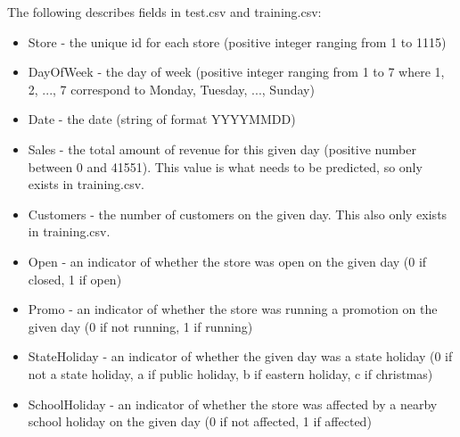 \documentclass[letterpaper,twocolumn,10pt]{article}
\begin{document}
The following describes fields in test.csv and training.csv:
\begin{itemize}
\item Store - the unique id for each store (positive integer ranging from 1 to 1115)
\item DayOfWeek - the day of week (positive integer ranging from 1 to 7 where 1, 2, ..., 7 correspond to Monday, Tuesday, ..., Sunday)
\item Date - the date (string of format YYYY­MM­DD)
\item Sales - the total amount of revenue for this given day (positive number between 0 and 41551). This value is what needs to be predicted, so only exists in training.csv.
\item Customers - the number of customers on the given day. This also only exists in training.csv.
\item Open - an indicator of whether the store was open on the given day (0 if closed, 1 if open)
\item Promo - an indicator of whether the store was running a promotion on the given day (0 if not running, 1 if running)
\item StateHoliday - an indicator of whether the given day was a state holiday (0 if not a state holiday, a if public holiday, b if eastern holiday, c if christmas)
\item SchoolHoliday - an indicator of whether the store was affected by a nearby school holiday on the given day (0 if not affected, 1 if affected)
\end{itemize}
\end{document}
